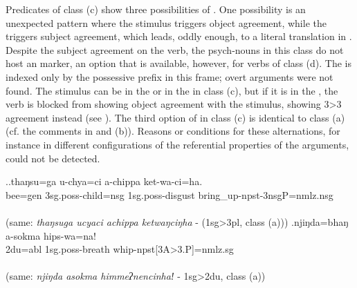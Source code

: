 Predicates of class (c) show three possibilities of . One possibility is an unexpected pattern where the stimulus triggers object agreement, while the  triggers subject agreement, which leads, oddly enough, to  a literal translation  in \Next[a]. Despite the subject agreement on the verb, the  psych-nouns in this class do not host an   marker,  an option that is available, however, for verbs of class (d). The  is indexed only  by the possessive prefix in this frame; overt  arguments were not found. The stimulus can be in the  or in the  in class (c), but if it is in the , the verb is blocked from showing object agreement with the stimulus, showing 3>3 agreement instead (see \Next[b]). The third option of  in class (c) is identical to class (a) (cf. the comments in \Next[a] and (b)). Reasons or conditions for these alternations, for instance  in different  configurations of the referential properties of the arguments, could not be detected. 

\ex.\ag.thaŋsu=ga u-chya=ci a-chippa ket-wa-ci=ha.\\
bee{\sc =gen} {\sc 3sg.poss-}child{\sc =nsg} {\sc 1sg.poss-}disgust bring\_up{\sc -npst-3nsgP=nmlz.nsg}\\
 \\
(same: \emph{thaŋsuga ucyaci achippa ketwaŋciŋha} - (1{\sc sg}>3{\sc pl}, class (a)))
\bg.njiŋda=bhaŋ a-sokma hips-wa=na!\\
{\sc 2du=abl} {\sc 1sg.poss-}breath whip-{\sc npst[3A>3.P]=nmlz.sg}\\
 \\
(same: \emph{njiŋda asokma himmeʔnencinhaǃ} - 1{\sc sg}>2{\sc du}, class (a))

